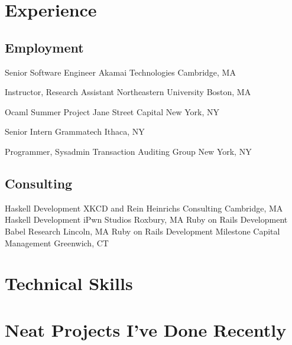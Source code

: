 \documentclass[10pt,letterpaper,sans]{moderncv}
\begin{document}
\makecvtitle

\section{Experience}

\subsection{Employment}

        {Senior Software Engineer}
        {Akamai Technologies}
        {Cambridge, MA}
        {}{}

        {Instructor, Research Assistant}
        {Northeastern University}
        {Boston, MA}
        {}{}

        {Ocaml Summer Project}
        {Jane Street Capital}
        {New York, NY}
        {}{}

        {Senior Intern}
        {Grammatech}
        {Ithaca, NY}
        {}{}

        {Programmer, Sysadmin}
        {Transaction Auditing Group}
        {New York, NY}
        {}{}

\subsection{Consulting}

        {Haskell Development}
        {XKCD and Rein Heinrichs Consulting}
        {Cambridge, MA}
        {}{}
        {Haskell Development}
        {iPwn Studios}
        {Roxbury, MA}
        {}{}
\cventry{}
        {Ruby on Rails Development}
        {Babel Research}
        {Lincoln, MA}
        {}{}
\cventry{}
        {Ruby on Rails Development}
        {Milestone Capital Management}
        {Greenwich, CT}
        {}{}

\section{Technical Skills}



\section{Neat Projects I've Done Recently}
\end{document}
